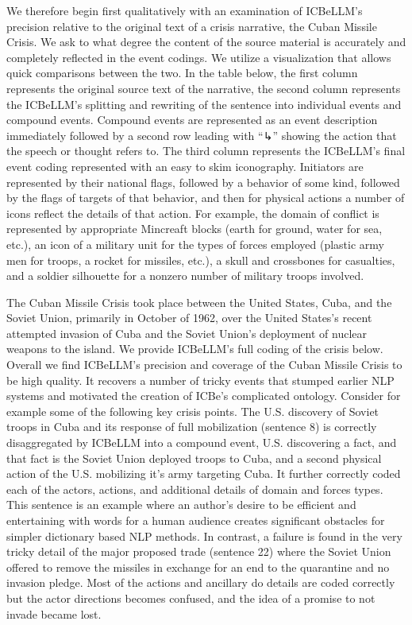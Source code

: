 \documentclass[
  letterpaper,
  DIV=11,
  numbers=noendperiod]{scrartcl}
\begin{document}
We therefore begin first qualitatively with an examination of ICBeLLM's
precision relative to the original text of a crisis narrative, the Cuban
Missile Crisis. We ask to what degree the content of the source material
is accurately and completely reflected in the event codings. We utilize
a visualization that allows quick comparisons between the two. In the
table below, the first column represents the original source text of the
narrative, the second column represents the ICBeLLM's splitting and
rewriting of the sentence into individual events and compound events.
Compound events are represented as an event description immediately
followed by a second row leading with ``↳'' showing the action that the
speech or thought refers to. The third column represents the ICBeLLM's
final event coding represented with an easy to skim iconography.
Initiators are represented by their national flags, followed by a
behavior of some kind, followed by the flags of targets of that
behavior, and then for physical actions a number of icons reflect the
details of that action. For example, the domain of conflict is
represented by appropriate Mincreaft blocks (earth for ground, water for
sea, etc.), an icon of a military unit for the types of forces employed
(plastic army men for troops, a rocket for missiles, etc.), a skull and
crossbones for casualties, and a soldier silhouette for a nonzero number
of military troops involved.

The Cuban Missile Crisis took place between the United States, Cuba, and
the Soviet Union, primarily in October of 1962, over the United States's
recent attempted invasion of Cuba and the Soviet Union's deployment of
nuclear weapons to the island. We provide ICBeLLM's full coding of the
crisis below. Overall we find ICBeLLM's precision and coverage of the
Cuban Missile Crisis to be high quality. It recovers a number of tricky
events that stumped earlier NLP systems and motivated the creation of
ICBe's complicated ontology. Consider for example some of the following
key crisis points. The U.S. discovery of Soviet troops in Cuba and its
response of full mobilization (sentence 8) is correctly disaggregated by
ICBeLLM into a compound event, U.S. discovering a fact, and that fact is
the Soviet Union deployed troops to Cuba, and a second physical action
of the U.S. mobilizing it's army targeting Cuba. It further correctly
coded each of the actors, actions, and additional details of domain and
forces types. This sentence is an example where an author's desire to be
efficient and entertaining with words for a human audience creates
significant obstacles for simpler dictionary based NLP methods. In
contrast, a failure is found in the very tricky detail of the major
proposed trade (sentence 22) where the Soviet Union offered to remove
the missiles in exchange for an end to the quarantine and no invasion
pledge. Most of the actions and ancillary do details are coded correctly
but the actor directions becomes confused, and the idea of a promise to
not invade became lost.
\end{document}
